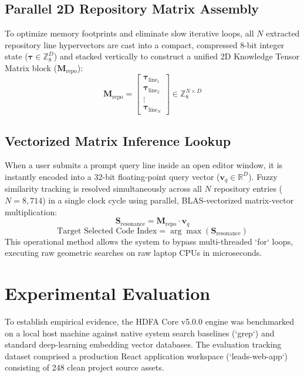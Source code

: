 \documentclass[twocolumn,10pt,journal]{article}
\begin{document}
\subsection{Parallel 2D Repository Matrix Assembly}
To optimize memory footprints and eliminate slow iterative loops, all $N$ extracted repository line hypervectors are cast into a compact, compressed 8-bit integer state ($\mathbf{\tau} \in \mathbb{Z}_8^D$) and stacked vertically to construct a unified 2D Knowledge Tensor Matrix block ($\mathbf{M}_{\text{repo}}$):
\begin{equation}
\mathbf{M}_{\text{repo}} = \begin{bmatrix} \mathbf{\tau}_{\text{line}_1} \\ \mathbf{\tau}_{\text{line}_2} \\ \vdots \\ \mathbf{\tau}_{\text{line}_N} \end{bmatrix} \in \mathbb{Z}_8^{N \times D}
\end{equation}

\subsection{Vectorized Matrix Inference Lookup}
When a user submits a prompt query line inside an open editor window, it is instantly encoded into a 32-bit floating-point query vector ($\mathbf{v}_q \in \mathbb{R}^D$). Fuzzy similarity tracking is resolved simultaneously across all $N$ repository entries ($N = 8,714$) in a single clock cycle using parallel, BLAS-vectorized matrix-vector multiplication:
\begin{equation}
\mathbf{S}_{\text{resonance}} = \mathbf{M}_{\text{repo}} \cdot \mathbf{v}_q
\end{equation}
\begin{equation}
\text{Target Selected Code Index} = \arg\max \left( \mathbf{S}_{\text{resonance}} \right)
\end{equation}
This operational method allows the system to bypass multi-threaded `for` loops, executing raw geometric searches on raw laptop CPUs in microseconds.

\section{Experimental Evaluation}
To establish empirical evidence, the HDFA Core v5.0.0 engine was benchmarked on a local host machine against native system search baselines (`grep`) and standard deep-learning embedding vector databases. The evaluation tracking dataset comprised a production React application workspace (`leads-web-app`) consisting of 248 clean project source assets.
\end{document}
